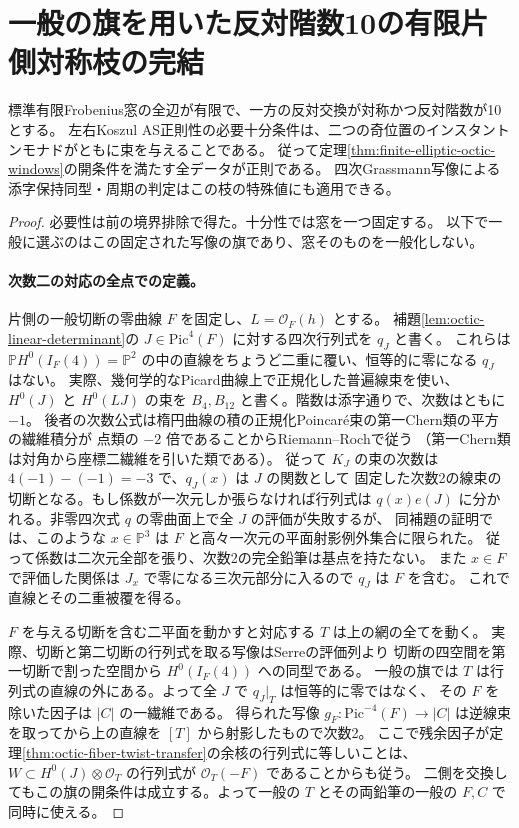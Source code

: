 \section{一般の旗を用いた反対階数10の有限片側対称枝の完結}
\label{sec:finite-rank-ten-full-regularity}
\begin{theorem}\label{thm:finite-rank-ten-full-regularity}
標準有限Frobenius窓の全辺が有限で、一方の反対交換が対称かつ反対階数が10とする。
左右Koszul AS正則性の必要十分条件は、二つの奇位置のインスタントンモナドがともに束を与えることである。
従って定理\ref{thm:finite-elliptic-octic-windows}の開条件を満たす全データが正則である。
四次Grassmann写像による添字保持同型・周期の判定はこの枝の特殊値にも適用できる。
\end{theorem}
\begin{proof}
必要性は前の境界排除で得た。十分性では窓を一つ固定する。
以下で一般に選ぶのはこの固定された写像の旗であり、窓そのものを一般化しない。

\paragraph{次数二の対応の全点での定義。}
片側の一般切断の零曲線 $F$ を固定し、$L=\mathcal O_F(h)$ とする。
補題\ref{lem:octic-linear-determinant}の $J\in\mathrm{Pic}^4(F)$ に対する四次行列式を $q_J$ と書く。
これらは $\mathbb P H^0(I_F(4))=\mathbb P^2$ の中の直線をちょうど二重に覆い、恒等的に零になる $q_J$ はない。
実際、幾何学的なPicard曲線上で正規化した普遍線束を使い、
$H^0(J)$ と $H^0(LJ)$ の束を $B_4,B_{12}$ と書く。階数は添字通りで、次数はともに $-1$。
後者の次数公式は楕円曲線の積の正規化Poincaré束の第一Chern類の平方の繊維積分が
点類の $-2$ 倍であることからRiemann--Rochで従う
（第一Chern類は対角から座標二繊維を引いた類である）。
従って $K_J$ の束の次数は $4(-1)-(-1)=-3$ で、$q_J(x)$ は $J$ の関数として
固定した次数2の線束の切断となる。もし係数が一次元しか張らなければ行列式は
$q(x)e(J)$ に分かれる。非零四次式 $q$ の零曲面上で全 $J$ の評価が失敗するが、
同補題の証明では、このような $x\in\mathbb P^3$ は $F$ と高々一次元の平面射影例外集合に限られた。
従って係数は二次元全部を張り、次数2の完全鉛筆は基点を持たない。
また $x\in F$ で評価した関係は $J_x$ で零になる三次元部分に入るので $q_J$ は $F$ を含む。
これで直線とその二重被覆を得る。

$F$ を与える切断を含む二平面を動かすと対応する $T$ は上の網の全てを動く。
実際、切断と第二切断の行列式を取る写像はSerreの評価列より
切断の四空間を第一切断で割った空間から $H^0(I_F(4))$ への同型である。
一般の旗では $T$ は行列式の直線の外にある。よって全 $J$ で $q_J|_T$ は恒等的に零ではなく、
その $F$ を除いた因子は $|C|$ の一繊維である。
得られた写像 $g_F:\mathrm{Pic}^{-4}(F)\to |C|$ は逆線束を取ってから上の直線を $[T]$ から射影したもので次数2。
ここで残余因子が定理\ref{thm:octic-fiber-twist-transfer}の余核の行列式に等しいことは、
$W\subset H^0(J)\otimes\mathcal O_T$ の行列式が $\mathcal O_T(-F)$ であることからも従う。
二側を交換してもこの旗の開条件は成立する。よって一般の $T$ とその両鉛筆の一般の $F,C$ で同時に使える。


\end{proof}
